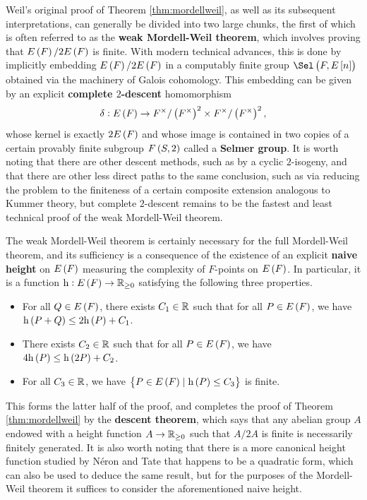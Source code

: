 Weil's original proof of Theorem \ref{thm:mordellweil}, as well as its subsequent interpretations, can generally be divided into two large chunks, the first of which is often referred to as the \textbf{weak Mordell-Weil theorem}, which involves proving that $ E\br{F} / 2E\br{F} $ is finite. With modern technical advances, this is done by implicitly embedding $ E\br{F} / 2E\br{F} $ in a computably finite group $ \Sel\br{F, E\sbr{n}} $ obtained via the machinery of Galois cohomology. This embedding can be given by an explicit \textbf{complete $ 2 $-descent} homomorphism
$$ \delta : E\br{F} \to F^\times / \br{F^\times}^2 \times F^\times / \br{F^\times}^2, $$
whose kernel is exactly $ 2E\br{F} $ and whose image is contained in two copies of a certain provably finite subgroup $ F\br{S, 2} $ called a \textbf{Selmer group}. It is worth noting that there are other descent methods, such as by a cyclic $ 2 $-isogeny, and that there are other less direct paths to the same conclusion, such as via reducing the problem to the finiteness of a certain composite extension analogous to Kummer theory, but complete $ 2 $-descent remains to be the fastest and least technical proof of the weak Mordell-Weil theorem.

\pagebreak

The weak Mordell-Weil theorem is certainly necessary for the full Mordell-Weil theorem, and its sufficiency is a consequence of the existence of an explicit \textbf{naive height} on $ E\br{F} $ measuring the complexity of $ F $-points on $ E\br{F} $. In particular, it is a function $ \h : E\br{F} \to \RR_{\ge 0} $ satisfying the following three properties.
\begin{itemize}
\item For all $ Q \in E\br{F} $, there exists $ C_1 \in \mathbb{R} $ such that for all $ P \in E\br{F} $, we have $ \h\br{P + Q} \le 2\h\br{P} + C_1 $.
\item There exists $ C_2 \in \mathbb{R} $ such that for all $ P \in E\br{F} $, we have $ 4\h\br{P} \le \h\br{2P} + C_2 $.
\item For all $ C_3 \in \mathbb{R} $, we have $ \cbr{P \in E\br{F} \mid \h\br{P} \le C_3} $ is finite.
\end{itemize}
This forms the latter half of the proof, and completes the proof of Theorem \ref{thm:mordellweil} by the \textbf{descent theorem}, which says that any abelian group $ A $ endowed with a height function $ A \to \mathbb{R}_{\ge 0} $ such that $ A / 2A $ is finite is necessarily finitely generated. It is also worth noting that there is a more canonical height function studied by N\'eron and Tate that happens to be a quadratic form, which can also be used to deduce the same result, but for the purposes of the Mordell-Weil theorem it suffices to consider the aforementioned naive height.

